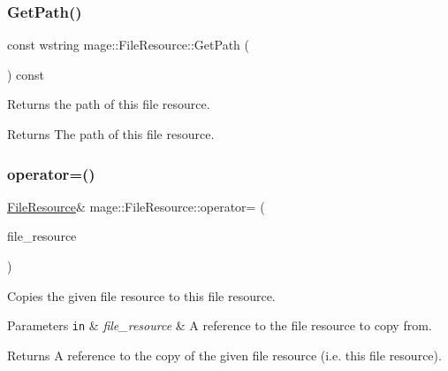 \subsubsection{\texorpdfstring{Get\+Path()}{GetPath()}}
{\footnotesize\ttfamily const wstring mage\+::\+File\+Resource\+::\+Get\+Path (\begin{DoxyParamCaption}{ }\end{DoxyParamCaption}) const}

Returns the path of this file resource.

\begin{DoxyReturn}{Returns}
The path of this file resource. 
\end{DoxyReturn}
\hypertarget{classmage_1_1_file_resource_a195da42fa3a40991e7c38cf8305b0bf2}{}\label{classmage_1_1_file_resource_a195da42fa3a40991e7c38cf8305b0bf2} 
\subsubsection{\texorpdfstring{operator=()}{operator=()}\hspace{0.1cm}{\footnotesize\ttfamily [1/2]}}
{\footnotesize\ttfamily \hyperlink{classmage_1_1_file_resource}{File\+Resource}\& mage\+::\+File\+Resource\+::operator= (\begin{DoxyParamCaption}\item[{const \hyperlink{classmage_1_1_file_resource}{File\+Resource} \&}]{file\+\_\+resource }\end{DoxyParamCaption})\hspace{0.3cm}{\ttfamily [delete]}}

Copies the given file resource to this file resource.


\begin{DoxyParams}[1]{Parameters}
\mbox{\tt in}  & {\em file\+\_\+resource} & A reference to the file resource to copy from. \\
\hline
\end{DoxyParams}
\begin{DoxyReturn}{Returns}
A reference to the copy of the given file resource (i.\+e. this file resource). 
\end{DoxyReturn}
\hypertarget{classmage_1_1_file_resource_a7ec207d6e9cb0bc4b8020aa73df986b6}{}\label{classmage_1_1_file_resource_a7ec207d6e9cb0bc4b8020aa73df986b6} 
